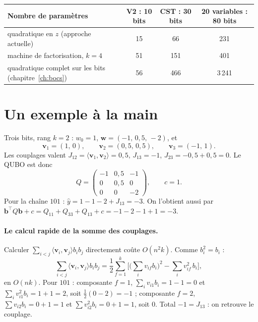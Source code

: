 \begin{center}
\renewcommand{\arraystretch}{1.2}
\small
\begin{tabular}{lccc}
\toprule
Nombre de paramètres & V2 : 10 bits & CST : 30 bits & 20 variables : 80 bits \\
\midrule
quadratique en $z$ (approche actuelle) & 15 & 66 & 231 \\
machine de factorisation, $k=4$ & 51 & 151 & 401 \\
quadratique complet sur les bits (chapitre~\ref{ch:bocs}) & 56 & 466 & 3\,241 \\
\bottomrule
\end{tabular}
\end{center}

\section{Un exemple à la main}
Trois bits, rang $k=2$ : $w_0=1$, $\mathbf w=(-1,\,0{,}5,\,-2)$, et
\[ \mathbf v_1=(1,\,0),\qquad\mathbf v_2=(0{,}5,\,0{,}5),\qquad\mathbf v_3=(-1,\,1). \]
Les couplages valent $J_{12}=\langle\mathbf v_1,\mathbf v_2\rangle=0{,}5$, $J_{13}=-1$, $J_{23}=-0{,}5+0{,}5=0$. Le QUBO est donc
\[ Q=\begin{pmatrix}-1&0{,}5&-1\\0&0{,}5&0\\0&0&-2\end{pmatrix},\qquad c=1. \]
Pour la chaîne $101$ : $\hat y=1-1-2+J_{13}=-3$. On l'obtient aussi par $\mathbf b^\top Q\mathbf b+c=Q_{11}+Q_{33}+Q_{13}+c=-1-2-1+1=-3$.

\paragraph{Le calcul rapide de la somme des couplages.} Calculer $\sum_{i<j}\langle\mathbf v_i,\mathbf v_j\rangle b_ib_j$ directement coûte $O(n^2k)$. Comme $b_i^2=b_i$ :
\[ \sum_{i<j}\langle\mathbf v_i,\mathbf v_j\rangle b_ib_j=\frac12\sum_{f=1}^k\Big[\Big(\sum_iv_{if}b_i\Big)^2-\sum_iv_{if}^2\,b_i\Big], \]
en $O(nk)$. Pour $101$ : composante $f=1$, $\sum_iv_{i1}b_i=1-1=0$ et $\sum_iv_{i1}^2b_i=1+1=2$, soit $\frac12(0-2)=-1$ ; composante $f=2$, $\sum v_{i2}b_i=0+1=1$ et $\sum v_{i2}^2b_i=0+1=1$, soit $0$. Total $-1=J_{13}$ : on retrouve le couplage.

